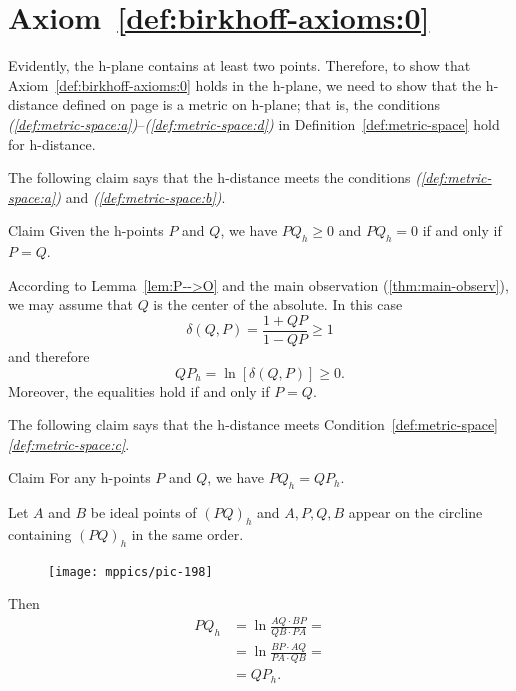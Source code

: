 \section*{Axiom~\ref{def:birkhoff-axioms:0}}

Evidently, the h-plane contains at least two points.
Therefore, to show that Axiom~\ref{def:birkhoff-axioms:0} holds in the h-plane, we need to show that the h-distance defined on page \pageref{h-dist} is a metric on h-plane;
that is, the conditions \textit{(\ref{def:metric-space:a})}--\textit{(\ref{def:metric-space:d})} 
in Definition~\ref{def:metric-space} hold for h-distance.


The following claim says that the h-distance meets the conditions \textit{(\ref{def:metric-space:a})} 
and \textit{(\ref{def:metric-space:b})}.

\begin{thm}{Claim}
Given the h-points $P$ and $Q$, we have
$PQ_h\ge 0$
and $PQ_h=0$ if and only if $P=Q$.
\end{thm}


According to Lemma~\ref{lem:P-->O}
and the main observation (\ref{thm:main-observ}), 
we may assume that $Q$ is the center of the absolute.
In this case
$$
\delta(Q,P)=\frac{1+QP}{1-QP}\ge 1$$
and therefore
$$QP_h=\ln[\delta(Q,P)]\ge 0.$$
Moreover, the equalities hold if and only if $P=Q$.
\qeds

The following claim says that the h-distance meets Condition~\ref{def:metric-space}\textit{\ref{def:metric-space:c}}.

\begin{thm}{Claim}
For any h-points $P$ and $Q$, we have
$PQ_h=QP_h$.
\end{thm}

Let $A$ and $B$ be ideal points of $(PQ)_h$ and
$A,P,Q,B$ appear on the circline containing $(PQ)_h$ in the same order.

{

\begin{figure}
\vskip-5mm
\centering
\texttt{[image: mppics/pic-198]}
\end{figure}

Then
\begin{align*}
PQ_h
&=\ln\frac{AQ\cdot BP}{QB\cdot PA}
=
\\
&=\ln\frac{BP\cdot AQ}{PA\cdot QB}=
\\
&=QP_h.
\end{align*}
\qedsf

}

